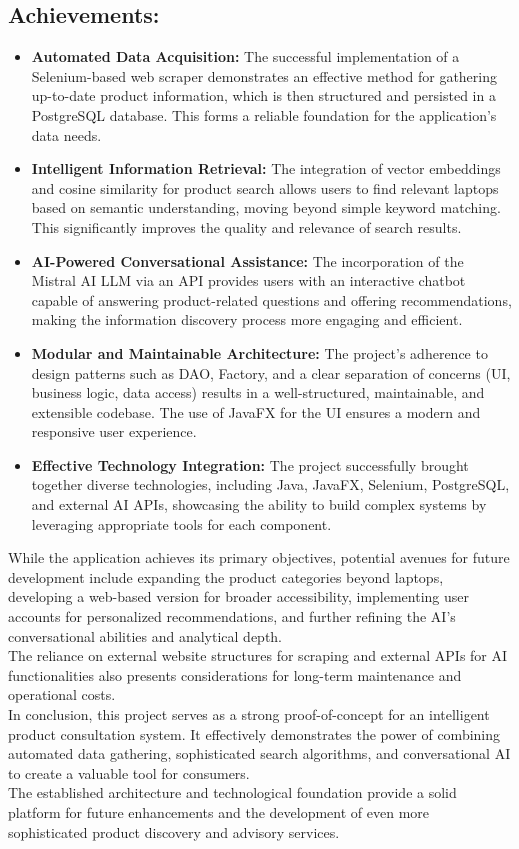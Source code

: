 \documentclass{article}
\begin{document}
\subsection*{Achievements:}
\begin{itemize}
    \item \textbf{Automated Data Acquisition:} The successful implementation of a Selenium-based web scraper demonstrates an effective method for gathering up-to-date product information, which is then structured and persisted in a PostgreSQL database. This forms a reliable foundation for the application's data needs.
    \item \textbf{Intelligent Information Retrieval:} The integration of vector embeddings and cosine similarity for product search allows users to find relevant laptops based on semantic understanding, moving beyond simple keyword matching. This significantly improves the quality and relevance of search results.
    \item \textbf{AI-Powered Conversational Assistance:} The incorporation of the Mistral AI LLM via an API provides users with an interactive chatbot capable of answering product-related questions and offering recommendations, making the information discovery process more engaging and efficient.
    \item \textbf{Modular and Maintainable Architecture:} The project's adherence to design patterns such as DAO, Factory, and a clear separation of concerns (UI, business logic, data access) results in a well-structured, maintainable, and extensible codebase. The use of JavaFX for the UI ensures a modern and responsive user experience.
    \item \textbf{Effective Technology Integration:} The project successfully brought together diverse technologies, including Java, JavaFX, Selenium, PostgreSQL, and external AI APIs, showcasing the ability to build complex systems by leveraging appropriate tools for each component.
\end{itemize}

While the application achieves its primary objectives, potential avenues for future development include expanding the product categories beyond laptops, developing a web-based version for broader accessibility, implementing user accounts for personalized recommendations, and further refining the AI's conversational abilities and analytical depth. 
\vspace{0.3cm}\\
The reliance on external website structures for scraping and external APIs for AI functionalities also presents considerations for long-term maintenance and operational costs.
\vspace{0.3cm}\\
In conclusion, this project serves as a strong proof-of-concept for an intelligent product consultation system. It effectively demonstrates the power of combining automated data gathering, sophisticated search algorithms, and conversational AI to create a valuable tool for consumers. 
\vspace{0.3cm}\\
The established architecture and technological foundation provide a solid platform for future enhancements and the development of even more sophisticated product discovery and advisory services.
\end{document}
